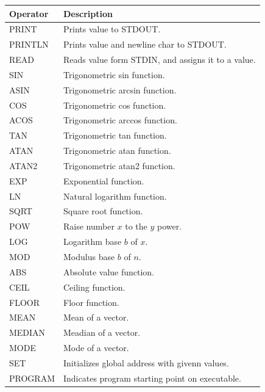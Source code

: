 \begin{figure}[H]
    \centering
    \begin{tabular}{p{1in}p{3in}}
        \toprule
        \textbf{Operator} & \textbf{Description}\\

        \midrule PRINT & Prints value to STDOUT.\\
        \midrule PRINTLN & Prints value and newline char to STDOUT.\\

        \midrule READ & Reads value form STDIN, and assigns it to a value.\\

        \midrule SIN & Trigonometric sin function.\\
        \midrule ASIN & Trigonometric arcsin function.\\
        \midrule COS & Trigonometric cos function.\\
        \midrule ACOS & Trigonometric arccos function.\\
        \midrule TAN & Trigonometric tan function.\\
        \midrule ATAN & Trigonometric atan function.\\
        \midrule ATAN2 & Trigonometric atan2 function.\\

        \midrule EXP & Exponential function.\\
        \midrule LN & Natural logarithm function.\\

        \midrule SQRT & Square root function.\\
        \midrule POW & Raise number $x$ to the $y$ power.\\
        \midrule LOG & Logarithm base $b$ of $x$.\\

        \midrule MOD & Modulus base $b$ of $n$.\\

        \midrule ABS & Absolute value function.\\
        \midrule CEIL & Ceiling function.\\
        \midrule FLOOR & Floor function.\\

        \midrule MEAN & Mean of a vector.\\
        \midrule MEDIAN & Meadian of a vector.\\
        \midrule MODE & Mode of a vector.\\

        \midrule SET &
        Initializes global address with givenn values.\\

        \midrule PROGRAM &
        Indicates program starting point on executable.\\

        \bottomrule
    \end{tabular}
\end{figure}

